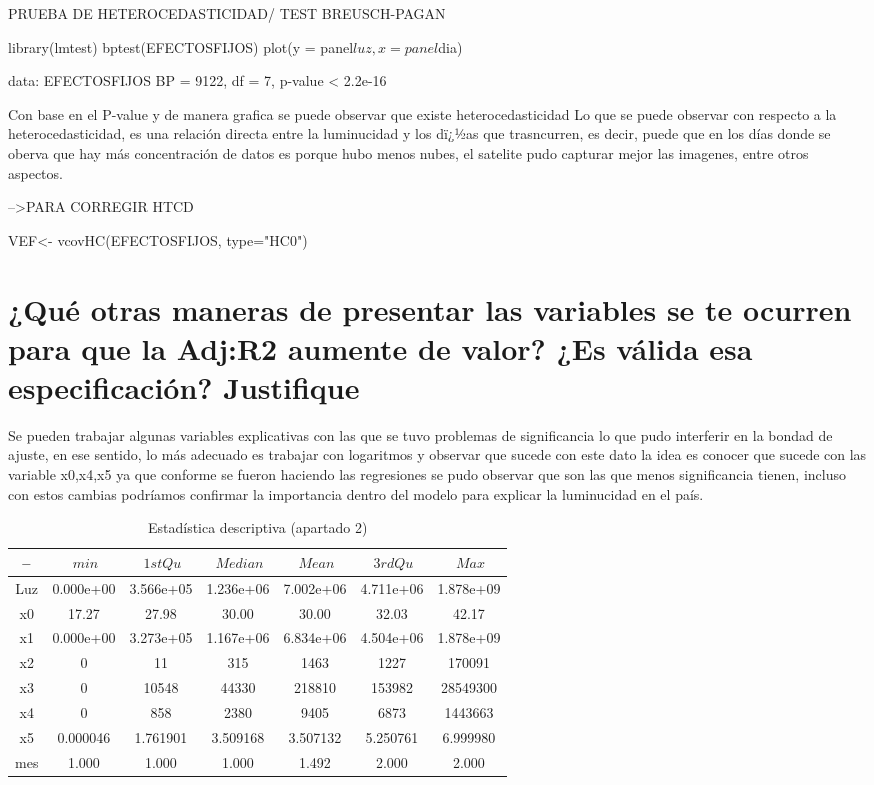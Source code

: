 \documentclass[letterpapper,12pt]{article}
\begin{document}
PRUEBA DE HETEROCEDASTICIDAD/ TEST BREUSCH-PAGAN

library(lmtest)
bptest(EFECTOSFIJOS)
plot(y = panel$luz, x =panel$dia)



data:  EFECTOSFIJOS
BP = 9122, df = 7, p-value < 2.2e-16




Con base en el P-value y de manera grafica se puede observar que existe heterocedasticidad Lo que se puede observar con respecto a la heterocedasticidad, es una relación directa entre  la luminucidad y los dï¿½as que trasncurren, es decir, puede que en los días donde se oberva que hay más concentración de datos es porque hubo menos nubes, el satelite pudo capturar mejor las imagenes, entre otros aspectos. 


-->PARA CORREGIR HTCD 

VEF<- vcovHC(EFECTOSFIJOS, type="HC0")

\section{¿Qué otras maneras de presentar las variables se te ocurren para que la Adj:R2 aumente de valor? ¿Es válida esa especificación? Justifique}

Se pueden trabajar algunas variables explicativas con las que se tuvo problemas de significancia lo que pudo interferir en la bondad de ajuste, en ese sentido, lo más adecuado es trabajar con logaritmos y observar que sucede con este dato la idea es conocer que sucede con las variable x0,x4,x5 ya que conforme se fueron haciendo las regresiones se pudo observar que son las que menos significancia tienen, incluso con estos cambias podríamos confirmar la importancia dentro del modelo para explicar la luminucidad en el país.


\begin{table}
\centering
\begin{tabular}{|c|c|c|c|c|c|c|}
	\hline
$\-- $ & $\ min$ & $\ 1st Qu$ & $\ Median$ & $\ Mean$ & $ \ 3rd Qu$ & $\ Max$\\
\hline\hline
	Luz & 0.000e+00 & 3.566e+05 & 1.236e+06 & 7.002e+06 & 4.711e+06 & 1.878e+09 \\
	\hline
	x0 & 17.27 & 27.98 & 30.00 & 30.00 & 32.03 & 42.17 \\
	\hline
	x1 & 0.000e+00 & 3.273e+05 & 1.167e+06 & 6.834e+06 & 4.504e+06 & 1.878e+09 \\
	\hline
	x2 & 0 & 11 & 315 & 1463 & 1227 & 170091 \\
	\hline
	x3 & 0 & 10548 & 44330 & 218810 & 153982  & 28549300 \\
	\hline
	x4 & 0 & 858 & 2380 & 9405 & 6873 & 1443663\\
	\hline
	x5 & 0.000046 & 1.761901 & 3.509168 & 3.507132 & 5.250761 & 6.999980 \\
	\hline
	mes & 1.000 & 1.000 & 1.000 & 1.492 & 2.000 & 2.000 \\
	\hline
\end{tabular}
\caption{Estadística descriptiva (apartado 2)}
\label{t1}
\end{table}
\end{document}
